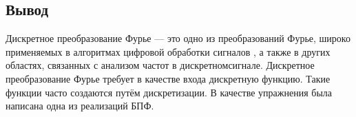 \subsection{Вывод}

Дискретное преобразование Фурье  — это одно из преобразований Фурье, широко применяемых в алгоритмах цифровой обработки сигналов , а также в других областях, связанных с анализом частот в дискретномсигнале. Дискретное преобразование Фурье требует в качестве входа дискретную функцию. Такие функции часто создаются путём дискретизации. В качестве упражнения была написана одна из реализаций БПФ.